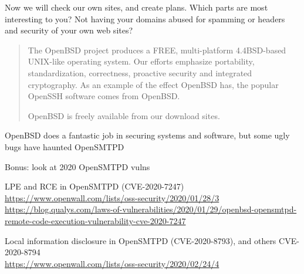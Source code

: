 \documentclass[Screen16to9,17pt]{foils}
\begin{document}
Now we will check our own sites, and create plans. Which parts are most interesting to you? Not having your domains abused for spamming or headers and security of your own web sites?



\begin{quote}
The OpenBSD project produces a FREE, multi-platform 4.4BSD-based UNIX-like operating system. Our efforts emphasize portability, standardization, correctness, proactive security and integrated cryptography. As an example of the effect OpenBSD has, the popular OpenSSH software comes from OpenBSD.

OpenBSD is freely available from our download sites.
\end{quote}

\begin{list2}
\item OpenBSD does a fantastic job in securing systems and software, but some ugly bugs have haunted OpenSMTPD 
\item Bonus: look at 2020 OpenSMTPD vulns
\item LPE and RCE in OpenSMTPD (CVE-2020-7247)\\{\footnotesize
\url{https://www.openwall.com/lists/oss-security/2020/01/28/3}\\
\url{https://blog.qualys.com/laws-of-vulnerabilities/2020/01/29/openbsd-opensmtpd-remote-code-execution-vulnerability-cve-2020-7247}}
\item Local information disclosure in OpenSMTPD (CVE-2020-8793), and others CVE-2020-8794\\{\footnotesize
\url{https://www.openwall.com/lists/oss-security/2020/02/24/4}}

\end{list2}







\slidenext
\end{document}
